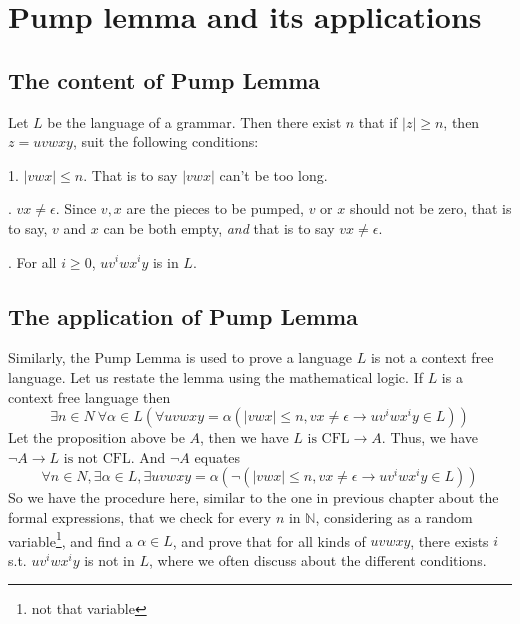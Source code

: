 \documentclass[../main.tex]{subfiles}
\begin{document}
\section{Pump lemma and its applications}
\label{sec:The Pump Lemma of grammar}

\subsection{The content of Pump Lemma}
\begin{thm}
\label{Pump Lemma}
Let \(L \) be the language of a grammar. Then there exist \(n\) that if \(|z| \ge n\), then \(z = uvwxy\), suit the following 
conditions: 

	\bigskip
	\setlength{\hangindent}{33pt}
	1. \(| v w x | \le n\). That is to say \( |v  w x |  \) can't be too long.

	. \(v x \ne\epsilon\). Since \(v,  x \) are the pieces to be pumped, \(v\) or \(x\) should not be zero, that is to 
	say, \(v\) and \(x\) can be both empty, \emph{and} that is to say \( v x \ne\epsilon\).

	. For all \(i \ge 0\), \(u v ^{i} w x ^{i} y\) is in \(L\).
\end{thm}

\subsection{The application of Pump Lemma}
Similarly, the Pump Lemma is used to prove a language \(L\) is not a context free language. Let us restate the lemma using the 
mathematical logic. If \(L\) is a context free language then 
\[
\exists n \in N \ \forall\alpha \in L (\forall uvwxy =\alpha (|v w x | \le n , vx \ne\epsilon \to  u v ^{i} w x ^{i} y \in L))
\]
Let the proposition above be \(A\), then we have \(L \text{ is CFL} \to A\). Thus, we have \(\neg A \to L \text{ is not CFL}\). 
And \(\neg A\) equates 
\[
\forall n \in N ,\exists\alpha \in L ,\exists u v w x y = \alpha (\neg  (|vwx| \le n , vx \ne \epsilon \to u v ^{i} w x ^{i} y \in L))
\]
So we have the procedure here, similar to the one in previous chapter about the formal expressions, that we check for every \(n\) in \(\mathbb{N}\), considering as a random variable\footnote{not that variable}, and find a \(\alpha \in L\), and prove that for all kinds of \( uvw xy\), there exists \(i\) s.t. \( u v ^{i} w x ^{i}y\) is not in \(L\), where we often discuss about the different conditions. 
\end{document}

